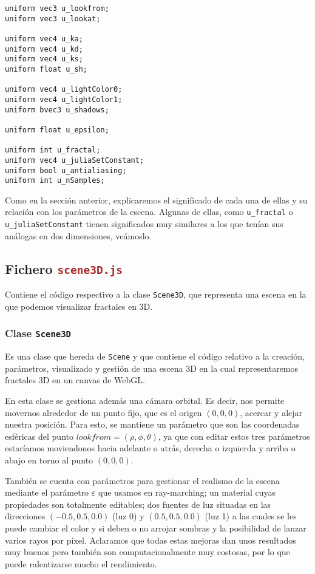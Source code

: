 \begin{lstlisting}
uniform vec3 u_lookfrom;
uniform vec3 u_lookat;

uniform vec4 u_ka;
uniform vec4 u_kd;
uniform vec4 u_ks;
uniform float u_sh;

uniform vec4 u_lightColor0;
uniform vec4 u_lightColor1;
uniform bvec3 u_shadows;

uniform float u_epsilon;

uniform int u_fractal;
uniform vec4 u_juliaSetConstant;
uniform bool u_antialiasing;
uniform int u_nSamples;
\end{lstlisting}

Como en la sección anterior, explicaremos el significado de cada una de ellas y su relación con los parámetros de la escena. Algunas de ellas, como \verb|u_fractal| o \verb|u_juliaSetConstant| tienen significados muy similares a los que tenían sus análogas en dos dimensiones, veámoslo.

\subsection{Fichero \Large\texttt{\textcolor{brown}{scene3D.js}}}

Contiene el código respectivo a la clase \verb|Scene3D|, que representa una escena en la que podemos visualizar fractales en 3D.

\subsubsection{Clase \Large\texttt{\textcolor{Bittersweet}{Scene3D}}}

Es una clase que hereda de \verb|Scene| y que contiene el código relativo a la creación, parámetros, visualizado y gestión de una escena 3D en la cual representaremos fractales 3D en un canvas de WebGL. 

En esta clase se gestiona además una cámara orbital. Es decir, nos permite movernos alrededor de un punto fijo, que es el origen $(0,0,0)$, acercar y alejar nuestra posición. Para esto, se mantiene un parámetro que son las coordenadas esféricas del punto $lookfrom=(\rho,\phi,\theta)$, ya que con editar estos tres parámetros estaríamos moviendonos hacia adelante o atrás, derecha o izquierda y arriba o abajo en torno al punto $(0,0,0)$.

También se cuenta con parámetros para gestionar el realismo de la escena mediante el parámetro $\varepsilon$ que usamos en ray-marching; un material cuyas propiedades son totalmente editables; dos fuentes de luz situadas en las direcciones $(-0.5, 0.5, 0.0)$ (luz 0) y $(0.5, 0.5, 0.0)$ (luz 1) a las cuales se les puede cambiar el color y si deben o no arrojar sombras y la posibilidad de lanzar varios rayos por píxel. Aclaramos que todas estas mejoras dan unos resultados muy buenos pero también son computacionalmente muy costosas, por lo que puede ralentizarse mucho el rendimiento.

